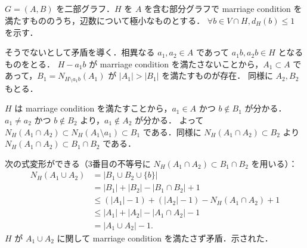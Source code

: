 \subsection{}
$G=(A,B)$ を二部グラフ．$H$ を $A$ を含む部分グラフで marriage condition を満たすもののうち，辺数について極小なものとする．
$\forall b\in V\cap H, d_H(b)\leq 1$ を示す．

そうでないとして矛盾を導く．相異なる $a_1,a_2\in A$ であって $a_1b, a_2b\in H$ となるものをとる．
$H-a_1b$ が marriage condition を満たさないことから，$A_1\subset A$ であって，$B_1 = N_{H\setminus a_1b}(A_1)$ が $|A_1|>|B_1|$ を満たすものが存在．
同様に $A_2, B_2$ もとる．

$H$ は marriage condition を満たすことから，$a_1\in A$ かつ $b\notin B_1$ が分かる．
$a_1\neq a_2$ かつ $b\notin B_2$ より，$a_1\notin A_2$ が分かる．
よって $N_H(A_1\cap A_2) \subset N_H(A_1\setminus a_1) \subset B_1$ である．同様に $N_H(A_1\cap A_2)\subset B_2$ より
$N_H(A_1\cap A_2) \subset B_1\cap B_2$ である．

次の式変形ができる（3番目の不等号に $N_H(A_1\cap A_2) \subset B_1\cap B_2$ を用いる）：
\begin{align*}
 N_H(A_1\cup A_2)
 &= |B_1\cup B_2\cup\{b\}|\\
 &= |B_1| + |B_2| - |B_1\cap B_2| + 1\\
 &\leq (|A_1|-1) + (|A_2|-1) - N_H(A_1\cap A_2) + 1\\
 &\leq |A_1| + |A_2| - |A_1\cap A_2| - 1\\
 &= |A_1\cup A_2| - 1. 
\end{align*}
$H$ が $A_1\cup A_2$ に関して marriage condition を満たさず矛盾．示された．